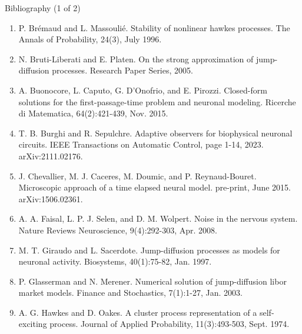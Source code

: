 \documentclass[8pt]{beamer}
\newcommand{\1}[1]{\mathbbm{1}_{\{#1\}}}
\begin{document}
\begin{frame}{Bibliography (1 of 2)}
    \begin{enumerate}[1.]
        \item P. Br\'emaud and L. Massouli\'e. Stability of nonlinear hawkes processes. The Annals of
        Probability, 24(3), July 1996.
        \item N. Bruti-Liberati and E. Platen. On the strong approximation of jump-diffusion processes.
        Research Paper Series, 2005.
        \item A. Buonocore, L. Caputo, G. D'Onofrio, and E. Pirozzi. Closed-form solutions for the
        first-passage-time problem and neuronal modeling. Ricerche di Matematica, 64(2):421-439,
        Nov. 2015.
        \item T. B. Burghi and R. Sepulchre. Adaptive observers for biophysical neuronal circuits. IEEE
        Transactions on Automatic Control, page 1-14, 2023. arXiv:2111.02176.
        \item J. Chevallier, M. J. Caceres, M. Doumic, and P. Reynaud-Bouret. Microscopic approach of a
        time elapsed neural model. pre-print, June 2015. arXiv:1506.02361.
        \item A. A. Faisal, L. P. J. Selen, and D. M. Wolpert. Noise in the nervous system. Nature Reviews
        Neuroscience, 9(4):292-303, Apr. 2008.
        \item M. T. Giraudo and L. Sacerdote. Jump-diffusion processes as models for neuronal activity.
        Biosystems, 40(1):75-82, Jan. 1997.
        \item P. Glasserman and N. Merener. Numerical solution of jump-diffusion libor market models.
        Finance and Stochastics, 7(1):1-27, Jan. 2003.
        \item A. G. Hawkes and D. Oakes. A cluster process representation of a self-exciting process.
        Journal of Applied Probability, 11(3):493-503, Sept. 1974.
    \end{enumerate}
\end{frame}
\end{document}

